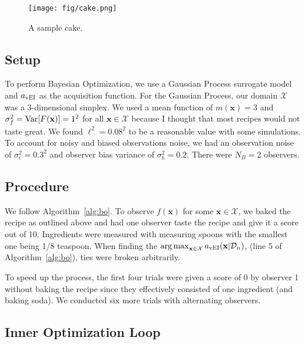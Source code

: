\begin{figure}[ht]
    \centering
    \texttt{[image: fig/cake.png]}
    \caption{A sample cake.}
    \label{fig:cake}
\end{figure}

\subsection{Setup}\label{ssec:setup}

To perform Bayesian Optimization, we use a Gaussian Process surrogate model and $a_{\mathrm{vEI}}$ as the acquisition function.
For the Gaussian Process, our domain $\mathcal{X}$ was a 3-dimensional simplex.
We used a mean function of $m(\mathbf{x}) = 3$ and $\sigma^2_f = \operatorname{Var}[F(\mathbf{x})] = 1 ^ 2$ for all $\mathbf{x} \in \mathcal{X}$ because
I thought that most recipes would not taste great.
We found $\ell^2 = 0.08^2$ to be a reasonable value with some simulations.
To account for noisy and biased observations noise, we had an observation noise of $\sigma^2_{\epsilon} = 0.3 ^ 2$ and observer bias variance of $\sigma_b^2 = 0.2$.
There were $N_B = 2$ observers.

\subsection{Procedure}\label{ssec:procedure}

We follow Algorithm~\ref{alg:bo}.
To observe $f(\mathbf{x})$ for some $\mathbf{x} \in \mathcal{X}$, we baked the recipe as outlined above and had one observer taste the recipe and give it a score out of 10.
Ingredients were measured with measuring spoons with the smallest one being 1/8 teaspoon.
When finding the $\operatorname*{arg\,max}_{\mathbf{x} \in \mathcal{X} } a_{\mathrm{vEI}}( \mathbf{x} | \mathcal{D}_n)$, (line 5 of Algorithm~\ref{alg:bo}), ties were broken arbitrarily.

To speed up the process, the first four trials were given a score of 0 by observer 1 without baking the recipe since they effectively consisted of one ingredient (and baking soda).
We conducted six more trials with alternating observers.

\subsection{Inner Optimization Loop}\label{ssec:inner-opt}

